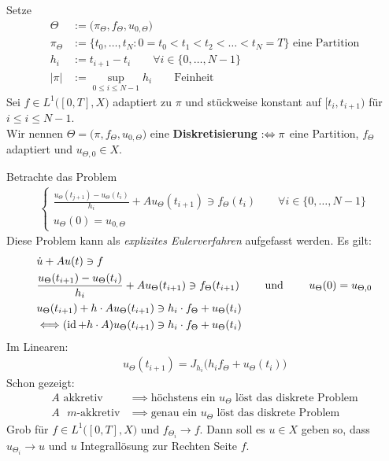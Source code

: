 \begin{definition}
Setze
\begin{align*}
\Theta&:=\big(\pi_\Theta,f_\Theta,u_{0,\Theta}\big)\\
\pi_\Theta&:=\big\lbrace t_0,\ldots,t_N: 0=t_0<t_1<t_2<\ldots<t_N=T\big\rbrace\text{ eine Partition}\\
h_i&:=t_{i+1}-t_i\qquad\forall i\in\lbrace0,\ldots,N-1\rbrace\\
|\pi|&:=\sup\limits_{0\leq i\leq N-1} h_i\qquad\text{Feinheit}
\end{align*}
Sei $f\in L^1\big([0,T],X\big)$ adaptiert zu $\pi$ und stückweise konstant auf $[t_i,t_{i+1})$ für $i\leq i\leq N-1$.\\
Wir nennen $\Theta=\big(\pi,f_\Theta,u_{0,\Theta}\big)$ eine \textbf{Diskretisierung} $:\Leftrightarrow\pi$ eine Partition, $f_\Theta$ adaptiert und $u_{\Theta,0}\in X$.
\end{definition}
Betrachte das Problem
\begin{align}\label{eqETheta}\tag{$E_\Theta$}
\left\lbrace\begin{array}{l}
\frac{u_\Theta(t_{j+1})-u_\Theta(t_i)}{h_i}+Au_\Theta(t_{i+1})\ni f_\Theta(t_i)\qquad\forall i\in\lbrace0,\ldots,N-1\rbrace\\
u_\Theta(0)=u_{0,\Theta}
\end{array}\right.
\end{align}
Diese Problem kann als \textit{explizites Eulerverfahren} aufgefasst werden. Es gilt:
\begin{align*}
&\dot{u}+Au(t)\ni f\\
&\frac{u_\Theta(t_{i+1})-u_\Theta(t_i)}{h_i}+Au_\Theta(t_{i+1})\ni f_\Theta(t_{i+1})
\qquad\text{ und }\qquad
u_\Theta(0)=u_{\Theta,0}\\
&u_\Theta(t_{i+1})+h\cdot A u_\Theta(t_{i+1})\ni h_i\cdot f_\Theta+u_\Theta(t_i)\\
&\Longleftrightarrow (\operatorname{id}+h\cdot A)u_\Theta(t_{i+1})\ni h_i\cdot f_\Theta+u_\Theta(t_i)
\end{align*}
Im Linearen:
\begin{align*}
u_\Theta(t_{i+1})=J_{h_i}\big(h_i f_\Theta+u_\Theta(t_i)\big)
\end{align*}
Schon gezeigt:
\begin{align*}
A\text{ akkretiv}&\implies\text{höchstens ein $u_\Theta$ löst das diskrete Problem}\\
A\text{ $m$-akkretiv}&\implies\text{genau ein $u_\Theta$ löst das diskrete Problem}
\end{align*}
Grob für $f\in L^1\big([0,T],X\big)$ und $f_{\Theta_i}\longrightarrow f$. Dann soll es $u\in X$ geben so, dass $u_{\Theta_i}\longrightarrow u$ und $u$ Integrallösung zur Rechten Seite $f$.

